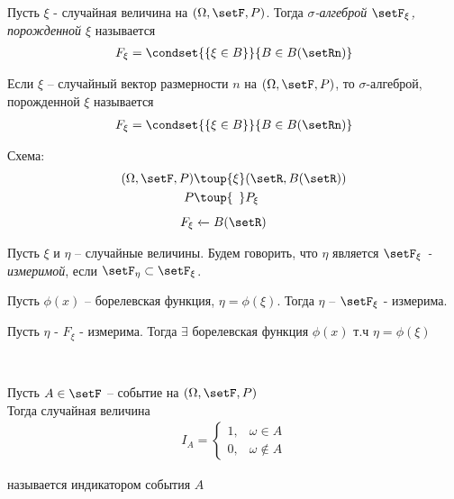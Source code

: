 
\begin{definition}
  Пусть $\xi$ - случайная величина на $(\Omega, \setF, P)$. 
  Тогда \emph{$\sigma$-алгеброй $\setF_\xi$, порожденной $\xi$} называется
  \begin{align*}
    F_\xi = \condset{\{ \xi \in B \}}{B \in B(\setRn)}
  \end{align*}
\end{definition}

\begin{definition}
  Если $\xi$ -- случайный вектор размерности $n$ на $(\Omega, \setF, P)$, 
  то $\sigma$-алгеброй, порожденной $\xi$ называется
  \begin{align*}
    F_\xi = \condset{\{ \xi \in B \}}{B \in B(\setRn)}
  \end{align*}
\end{definition}

Схема:
\begin{align*}
  (\Omega, \setF, P) &\toup{\xi} (\setR, B(\setR))\\
  P                  &\toup{\phantom{\xi}} P_\xi\\
  F_\xi              &\xleftarrow{\phantom{\xi}} B(\setR)
\end{align*}

\begin{definition}
  Пусть $\xi$ и $\eta$ -- случайные величины. 
  Будем говорить, что $\eta$ является \emph{$\setF_\xi$ - измеримой}, 
  если $\setF_\eta \subset \setF_\xi$.
\end{definition}

\begin{exercise}
  Пусть $\phi(x)$ -- борелевская функция, $\eta = \phi(\xi)$. Тогда $\eta$ -- $\setF_\xi$ - измерима.
\end{exercise}

\begin{theorem}
  Пусть $\eta$ - $F_\xi$ - измерима. 
  Тогда $\exists$ борелевская функция $\phi(x)$ т.ч\; $\eta = \phi(\xi)$
\end{theorem}

\begin{definition}~

  Пусть $A \in \setF$ -- событие на $(\Omega, \setF, P)$\\
  Тогда случайная величина\\
  \begin{align*}
    I_A = \begin{cases}
              1, & \omega \in A\\
              0, & \omega \not\in A
          \end{cases}
  \end{align*}

  называется индикатором события $A$
\end{definition}

